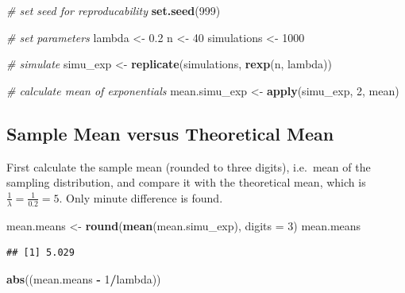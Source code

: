 \documentclass[]{article}
\newenvironment{Shaded}{\begin{snugshade}}{\end{snugshade}}
\newcommand{\KeywordTok}[1]{\textcolor[rgb]{0.13,0.29,0.53}{\textbf{#1}}}
\newcommand{\DataTypeTok}[1]{\textcolor[rgb]{0.13,0.29,0.53}{#1}}
\newcommand{\DecValTok}[1]{\textcolor[rgb]{0.00,0.00,0.81}{#1}}
\newcommand{\FloatTok}[1]{\textcolor[rgb]{0.00,0.00,0.81}{#1}}
\newcommand{\StringTok}[1]{\textcolor[rgb]{0.31,0.60,0.02}{#1}}
\newcommand{\CommentTok}[1]{\textcolor[rgb]{0.56,0.35,0.01}{\textit{#1}}}
\newcommand{\OperatorTok}[1]{\textcolor[rgb]{0.81,0.36,0.00}{\textbf{#1}}}
\newcommand{\NormalTok}[1]{#1}
\begin{document}
\begin{Shaded}
\begin{Highlighting}[]
\CommentTok{# set seed for reproducability}
\KeywordTok{set.seed}\NormalTok{(}\DecValTok{999}\NormalTok{)}

\CommentTok{# set parameters}
\NormalTok{lambda <-}\StringTok{ }\FloatTok{0.2}
\NormalTok{n <-}\StringTok{ }\DecValTok{40}
\NormalTok{simulations <-}\StringTok{ }\DecValTok{1000}

\CommentTok{# simulate}
\NormalTok{simu_exp <-}\StringTok{ }\KeywordTok{replicate}\NormalTok{(simulations, }\KeywordTok{rexp}\NormalTok{(n, lambda))}

\CommentTok{# calculate mean of exponentials}
\NormalTok{mean.simu_exp <-}\StringTok{ }\KeywordTok{apply}\NormalTok{(simu_exp, }\DecValTok{2}\NormalTok{, mean)}
\end{Highlighting}
\end{Shaded}

\newpage

\subsection{Sample Mean versus Theoretical
Mean}\label{sample-mean-versus-theoretical-mean}

First calculate the sample mean (rounded to three digits), i.e.~mean of
the sampling distribution, and compare it with the theoretical mean,
which is \(\frac{1}{\lambda}=\frac{1}{0.2}=5\). Only minute difference
is found.

\begin{Shaded}
\begin{Highlighting}[]
\NormalTok{mean.means <-}\StringTok{ }\KeywordTok{round}\NormalTok{(}\KeywordTok{mean}\NormalTok{(mean.simu_exp), }\DataTypeTok{digits =} \DecValTok{3}\NormalTok{)}
\NormalTok{mean.means}
\end{Highlighting}
\end{Shaded}

\begin{verbatim}
## [1] 5.029
\end{verbatim}

\begin{Shaded}
\begin{Highlighting}[]
\KeywordTok{abs}\NormalTok{((mean.means }\OperatorTok{-}\StringTok{ }\DecValTok{1}\OperatorTok{/}\NormalTok{lambda))}
\end{Highlighting}
\end{Shaded}
\end{document}
